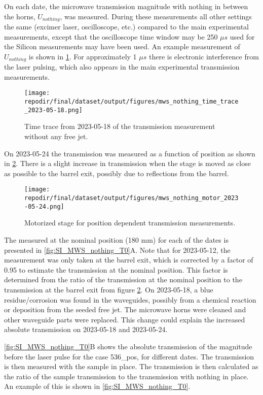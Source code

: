 On each date, the microwave transmission magnitude with nothing in between the horns, $U_{nothing}$, was measured. During these measurements all other settings the same (excimer laser, oscilloscope, etc.) compared to the main experimental measurements, except that the oscilloscope time window may be 250 $\mu s$ used for the Silicon measurements may have been used. An example measurement of $U_{nothing}$ is shown in \ref{fig:SI_MWS_nothing_time_trace}. For approximately 1 $\mu s$ there is electronic interference from the laser pulsing, which also appears in the main experimental transmission measurements. 



\begin{figure}[]
\centering
\texttt{[image: \\repodir/final/dataset/output/figures/mws\_nothing\_time\_trace\_2023-05-18.png]}
\caption{Time trace from 2023-05-18 of the transmission measurement without any free jet.}
\label{fig:SI_MWS_nothing_time_trace}
\end{figure}

On 2023-05-24 the transmission was measured as a function of position as shown in \ref{fig:SI_MWS_nothing_motor}. There is a slight increase in transmission when the stage is moved as close as possible to the barrel exit, possibly due to reflections from the barrel.


\begin{figure}
\centering
\texttt{[image: \\repodir/final/dataset/output/figures/mws\_nothing\_motor\_2023-05-24.png]}
\caption{Motorized stage for position dependent transmission measurements.}
\label{fig:SI_MWS_nothing_motor}
\end{figure}


The  measured at the nominal position (180 mm) for each of the dates is presented in \ref{fig:SI_MWS_nothing_T0}A. Note that for 2023-05-12, the measurement was only taken at the barrel exit, which is corrected by a factor of 0.95 to estimate the transmission at the nominal position. This factor is determined from the ratio of the transmission at the nominal position to the transmission at the barrel exit from figure \ref{fig:SI_MWS_nothing_motor}. On 2023-05-18, a blue residue/corrosion was found in the waveguides, possibly from a chemical reaction or deposition from the seeded free jet. The microwave horns were cleaned and other waveguide parts were replaced. This change could explain the increased absolute transmission on 2023-05-18 and 2023-05-24.  

\ref{fig:SI_MWS_nothing_T0}B shows the absolute transmission of the magnitude before the laser pulse for the case 536\_pos, for different dates. The transmission is then measured with the sample in place. The transmission is then calculated as the ratio of the sample transmission to the transmission with nothing in place. An example of this is shown in \ref{fig:SI_MWS_nothing_T0}.  


